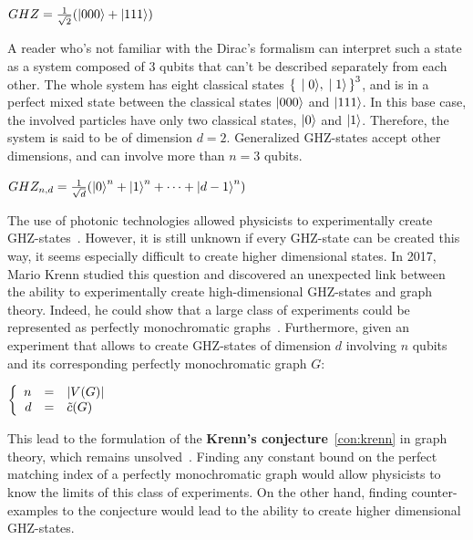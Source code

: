 \begin{center}
    $GHZ = \frac{1}{\sqrt{2}}(\ket{000} + \ket{111})$
\end{center}

A reader who's not familiar with the Dirac's formalism can interpret such a state as a system composed of 3 qubits that can't be described separately from each other.
The whole system has eight classical states $\set{\ket{0}, \ket{1}}^3$, and is in a perfect mixed state between the classical states $\ket{000}$ and $\ket{111}$.
In this base case, the involved particles have only two classical states, $\ket{0}$ and $\ket{1}$.
Therefore, the system is said to be of dimension $d = 2$.   %
Generalized GHZ-states accept other dimensions, and can involve more than $n = 3$ qubits.

\begin{center}
    $GHZ_{n, d} = \frac{1}{\sqrt{d}}(\ket{0}^n + \ket{1}^n + \dots + \ket{d-1}^n)$
\end{center}

The use of photonic technologies allowed physicists to experimentally create GHZ-states~\cite{wang2016experimental}.
However, it is still unknown if every GHZ-state can be created this way, it seems especially difficult to create higher dimensional states.
In 2017, Mario Krenn studied this question and discovered an unexpected link between the ability to experimentally create high-dimensional GHZ-states and graph theory.
Indeed, he could show that a large class of experiments could be represented as perfectly monochromatic graphs~\cite{Krenn_2017}.
Furthermore, given an experiment that allows to create GHZ-states of dimension $d$ involving $n$ qubits and its corresponding perfectly monochromatic graph $G$:

\begin{center}
    $\left\{
        \begin{array}{r c l}
            n & = & \left|V(G)\right| \\
            d & = & \Tilde{c}(G)
        \end{array}
    \right.$
\end{center}

This lead to the formulation of the \textbf{Krenn's conjecture}~\ref{con:krenn} in graph theory, which remains unsolved~\cite{wordpress}.
Finding any constant bound on the perfect matching index of a perfectly monochromatic graph would allow physicists to know the limits of this class of experiments.
On the other hand, finding counter-examples to the conjecture would lead to the ability to create higher dimensional GHZ-states. \\

